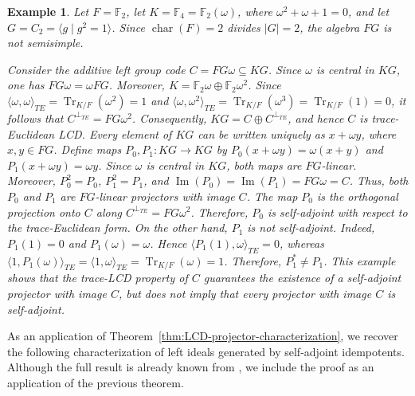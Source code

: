 \documentclass[11pt]{article}
\newtheorem{example}[theorem]{Example}
\begin{document}
\begin{example}\label{projector-existencia}
Let $F=\mathbb{F}_2$, let
$K=\mathbb{F}_4=\mathbb{F}_2(\omega)$, where
$\omega^2+\omega+1=0$, and let
$G=C_2=\langle g\mid g^2=1\rangle$. Since
$\operatorname{char}(F)=2$ divides $|G|=2$, the algebra $FG$ is not
semisimple.

Consider the additive left group code $C=FG\omega\subseteq KG$. Since
$\omega$ is central in $KG$, one has $FG\omega=\omega FG$. Moreover,
$K=\mathbb{F}_2\omega\oplus\mathbb{F}_2\omega^2$. Since
$\langle\omega,\omega\rangle_{TE}=
\operatorname{Tr}_{K/F}(\omega^2)=1$ and
$\langle\omega,\omega^2\rangle_{TE}=
\operatorname{Tr}_{K/F}(\omega^3)=\operatorname{Tr}_{K/F}(1)=0$, it follows
that $C^{\perp_{TE}}=FG\omega^2$. Consequently,
$KG=C\oplus C^{\perp_{TE}}$, and hence $C$ is trace-Euclidean LCD. Every element of $KG$ can be written uniquely as $x+\omega y$, where
$x,y\in FG$. Define maps $P_0,P_1:KG\longrightarrow KG$ by
$P_0(x+\omega y)=\omega(x+y)$ and $P_1(x+\omega y)=\omega y$. Since
$\omega$ is central in $KG$, both maps are $FG$-linear. Moreover,
$P_0^2=P_0$, $P_1^2=P_1$, and
$\operatorname{Im}(P_0)=\operatorname{Im}(P_1)=FG\omega=C$. Thus, both
$P_0$ and $P_1$ are $FG$-linear projectors with image $C$. The map $P_0$ is the orthogonal projection onto $C$ along
$C^{\perp_{TE}}=FG\omega^2$. Therefore, $P_0$ is self-adjoint with respect
to the trace-Euclidean form. On the other hand, $P_1$ is not self-adjoint.
Indeed, $P_1(1)=0$ and $P_1(\omega)=\omega$. Hence
$\langle P_1(1),\omega\rangle_{TE}=0$, whereas
$\langle1,P_1(\omega)\rangle_{TE}=
\langle1,\omega\rangle_{TE}=
\operatorname{Tr}_{K/F}(\omega)=1$. Therefore, $P_1^*\neq P_1$. This example shows that the trace-LCD property of $C$ guarantees the
existence of a self-adjoint projector with image $C$, but does not imply that
every projector with image $C$ is self-adjoint.
\end{example}



As an application of Theorem~\ref{thm:LCD-projector-characterization}, we recover the following characterization of left ideals generated by self-adjoint idempotents. Although the full result is already known from \cite{CruzWillems2017,BBW24}, we include the proof as an application of the previous theorem.
\end{document}
